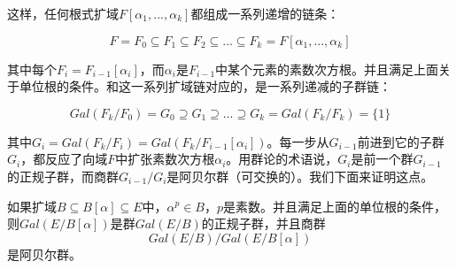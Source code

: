 \documentclass{article}
\begin{document}
这样，任何根式扩域$F[\alpha_1, ..., \alpha_k]$都组成一系列递增的链条：

\[
F = F_0 \subseteq F_1 \subseteq F_2 \subseteq ... \subseteq F_k = F[\alpha_1, ..., \alpha_k]
\]

其中每个$F_i = F_{i-1}[\alpha_i]$，而$\alpha_i$是$F_{i-1}$中某个元素的素数次方根。并且满足上面关于单位根的条件。和这一系列扩域链对应的，是一系列递减的子群链：

\[
Gal(F_k/F_0) = G_0 \supseteq G_1 \supseteq ... \supseteq G_k = Gal(F_k/F_k) = \{1\}
\]

其中$G_i = Gal(F_k/F_i) = Gal(F_k/F_{i-1}[\alpha_i])$。每一步从$G_{i-1}$前进到它的子群$G_i$，都反应了向域$F$中扩张素数次方根$\alpha_i$。用群论的术语说，$G_i$是前一个群$G_{i-1}$的正规子群，而商群$G_{i-1}/G_i$是阿贝尔群（可交换的）。我们下面来证明这点。

\begin{theorem}
如果扩域$B \subseteq B[\alpha] \subseteq E$中，$\alpha^p \in B$，$p$是素数。并且满足上面的单位根的条件，则$Gal(E/B[\alpha])$是群$Gal(E/B)$的正规子群，并且商群
\[
Gal(E/B) / Gal(E/B[\alpha])
\]
是阿贝尔群。
\end{theorem}
\end{document}
